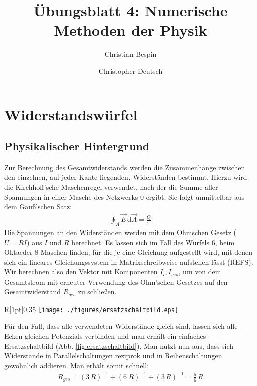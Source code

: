 \documentclass[10pt,a4paper]{article}
\author{Christian Bespin \and Christopher Deutsch}
\title{Übungsblatt 4: Numerische Methoden der Physik}
\begin{document}
\maketitle

\setcounter{section}{1}

\section{Widerstandswürfel}

\subsection{Physikalischer Hintergrund}

Zur Berechnung des Gesamtwiderstands werden die Zusammenhänge zwischen den einzelnen, auf jeder Kante liegenden, Widerständen bestimmt. Hierzu wird die Kirchhoff'sche Maschenregel verwendet, nach der die Summe aller Spannungen in einer Masche des Netzwerks $0$ ergibt. Sie folgt unmittelbar aus dem Gauß'schen Satz:
\begin{align}
\oint_A \vec{E}\,\mathrm{d}\vec{A}=\frac{Q}{\epsilon_0}
\end{align}
Die Spannungen an den Widerständen werden mit dem Ohmschen Gesetz ($U=R I$) aus $I$ und $R$ berechnet. Es lassen sich im Fall des Würfels $6$, beim Oktaeder $8$ Maschen finden, für die je eine Gleichung aufgestellt wird, mit denen sich ein lineares Gleichungssystem in Matrixschreibweise aufstellen lässt (REFS). Wir berechnen also den Vektor mit Komponenten $I_i, I_{ges}$, um von dem Gesamtstrom mit erneuter Verwendung des Ohm'schen Gesetzes auf den Gesamtwiderstand $R_{ges}$ zu schließen.
\begin{wrapfigure}[14]{R}[1pt]{0.35\textwidth}
\centering
\texttt{[image: ./figures/ersatzschaltbild.eps]}
\caption{Schaltbild für gleiche Widerstände $R$}
\label{fig:ersatzschaltbild}
\end{wrapfigure}

\noindent Für den Fall, dass alle verwendeten Widerstände gleich sind, lassen sich alle Ecken gleichen Potenzials verbinden und man erhält ein einfaches Ersatzschaltbild (Abb. \ref{fig:ersatzschaltbild}). Man nutzt nun aus, dass sich Widerstände in Parallelschaltungen reziprok und in Reihenschaltungen gewöhnlich addieren. Man erhält somit schnell:
\begin{align}
R_{ges}=\left( 3\,R\right)^{-1}+\left( 6\,R\right)^{-1}+\left( 3\,R\right)^{-1}=\frac{5}{6}\,R
\end{align}
\end{document}
